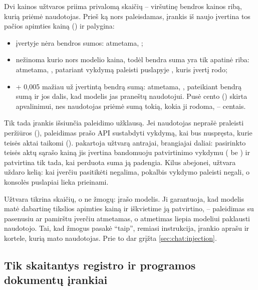 \begin{codebox}{Dvi kainos užtvaros}
 priima privalomą skaičių  -- viršutinę
bendros kainos ribą, kurią priėmė naudotojas. Prieš ką nors paleisdamas, įrankis iš naujo
įvertina tos pačios apimties kainą () ir palygina:
\begin{itemize}
  \item įvertyje nėra bendros sumos: atmetama, ;
  \item nežinoma kurio nors modelio kaina, todėl bendra suma yra tik apatinė riba: atmetama,
    , patariant vykdymą paleisti puslapyje , kuris įvertį
    rodo;
  \item {} + 0,005 mažiau už įvertintą bendrą sumą: atmetama,
    , pateikiant bendrą sumą ir jos dalis, kad modelis jas praneštų
    naudotojui. Pusė cento () skirta apvalinimui, nes naudotojas priėmė
    sumą tokią, kokia ji rodoma, -- centais.
\end{itemize}
Tik tada įrankis išsiunčia paleidimo užklausą. Jei naudotojas neprašė praleisti peržiūros
(), paleidimas prašo API sustabdyti vykdymą, kai bus nuspręsta, kurie teisės
aktai taikomi ().  pakartoja užtvarą antrajai,
brangiajai daliai: pasirinkto teisės aktų sąrašo kainą jis įvertina bandomuoju patvirtinimo
vykdymu ( be ) ir patvirtina tik tada, kai
perduota suma ją padengia. Kilus abejonei, užtvara uždaro kelią: kai įverčiu pasitikėti negalima,
pokalbis vykdymo paleisti negali, o konsolės puslapiai lieka prieinami.
\end{codebox}

Užtvara tikrina skaičių, o ne žmogų:  įrašo modelis. Ji garantuoja, kad
modelis matė dabartinę tikslios apimties kainą ir iškvietime ją patvirtino, -- paleidimas su
pasenusiu ar pamirštu įverčiu atmetamas, o atmetimas liepia modeliui paklausti naudotojo. Tai, kad
žmogus pasakė \enquote{taip}, remiasi instrukcija, įrankio aprašu ir kortele, kurią mato
naudotojas. Prie to dar grįžta \cref{sec:chat:injection}.

\subsection{Tik skaitantys registro ir programos dokumentų įrankiai}

